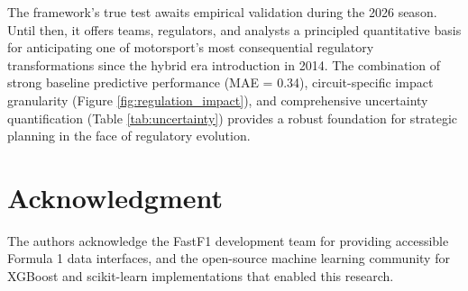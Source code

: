 \documentclass[conference]{IEEEtran}
\begin{document}
The framework's true test awaits empirical validation during the 2026 season. Until then, it offers teams, regulators, and analysts a principled quantitative basis for anticipating one of motorsport's most consequential regulatory transformations since the hybrid era introduction in 2014. The combination of strong baseline predictive performance (MAE = 0.34), circuit-specific impact granularity (Figure \ref{fig:regulation_impact}), and comprehensive uncertainty quantification (Table \ref{tab:uncertainty}) provides a robust foundation for strategic planning in the face of regulatory evolution.

\section*{Acknowledgment}

The authors acknowledge the FastF1 development team for providing accessible Formula 1 data interfaces, and the open-source machine learning community for XGBoost and scikit-learn implementations that enabled this research.
\end{document}
